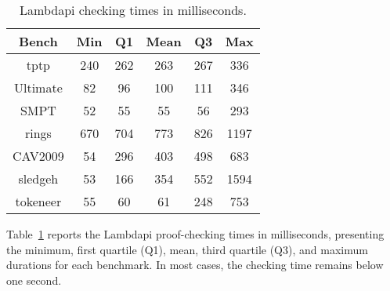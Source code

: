\begin{table}[t]
\centering
\caption{Lambdapi checking times in milliseconds.}
\begin{tabular}{|c|c|c|c|c|c|}
\hline
\textbf{Bench}      & \textbf{Min} & \textbf{Q1} & \textbf{Mean} & \textbf{Q3} & \textbf{Max} \\ \hline
tptp                & 240          & 262         & 263           & 267         & 336          \\ \hline
Ultimate            & 82           & 96          & 100           & 111         & 346          \\ \hline
SMPT                & 52           & 55          & 55            & 56          & 293          \\ \hline
rings               & 670          & 704         & 773           & 826         & 1197         \\ \hline
CAV2009           & 54           & 296         & 403           & 498         & 683          \\ \hline
sledgeh             & 53           & 166         & 354           & 552         & 1594         \\ \hline
tokeneer            & 55           & 60          & 61            & 248         & 753          \\ \hline
\end{tabular}
\label{table:benchmarks-list}
\end{table}

Table~\ref{table:benchmarks-list} reports the Lambdapi proof-checking times in milliseconds, presenting the minimum, first quartile (Q1), mean, third quartile (Q3), and maximum durations for each benchmark.
In most cases, the checking time remains below one second.
